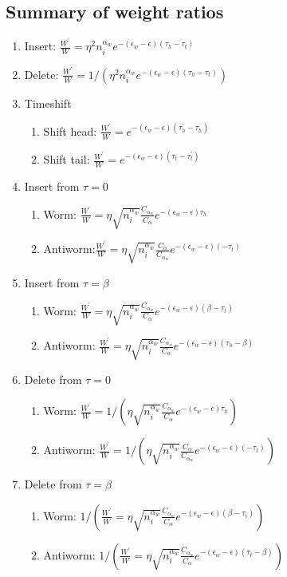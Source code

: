 \documentclass[12pt, two sided]{article}
\begin{document}
	\subsection{Summary of weight ratios}	
    \begin{enumerate}
        \setcounter{enumi}{0}
    \item Insert:  $\frac{W^\prime}{W}= \eta^2 n_i^{\alpha_w} e^{-(\epsilon_w-\epsilon)(\tau_h-\tau_t)}$
    \item Delete: $\frac{W^\prime}{W}= 1/(\eta^2 n_i^{\alpha_w} e^{-(\epsilon_w-\epsilon)(\tau_h-\tau_t)})$
    \item Timeshift
    	\begin{enumerate}
	\item{Shift head: $\frac{W^\prime}{W}=e^{-(\epsilon_w-\epsilon)(\tau_h^\prime-\tau_h)}$}
	\item{Shift tail: $\frac{W^\prime}{W}=e^{-(\epsilon_w-\epsilon)(\tau_t-\tau_t^\prime)}$}
	\end{enumerate}
    \item Insert from $\tau=0$
    	\begin{enumerate}
	\item{Worm: $\frac{W^\prime}{W}= \eta \sqrt{n_i^{\alpha_w}} \frac{C_{\alpha_w}}{C_{\alpha}}e^{-(\epsilon_w-\epsilon)\tau_h}$ }
	\item{Antiworm:$\frac{W^\prime}{W}= \eta \sqrt{n_i^{\alpha_w}} \frac{C_{\alpha}}{C_{\alpha_w}}e^{-(\epsilon_w-\epsilon)(-\tau_t)}$ }
	\end{enumerate}
    \item Insert from $\tau=\beta$
    	\begin{enumerate}
	\item{Worm: $\frac{W^\prime}{W}= \eta \sqrt{n_i^{\alpha_w}} \frac{C_{\alpha_w}}{C_{\alpha}}e^{-(\epsilon_w-\epsilon)(\beta-\tau_t)}$}
	\item{Antiworm: $\frac{W^\prime}{W}= \eta \sqrt{n_i^{\alpha_w}} \frac{C_{\alpha_w}}{C_{\alpha}}e^{-(\epsilon_w-\epsilon)(\tau_h - \beta)}$}
	\end{enumerate}
    \item Delete from $\tau=0$
    	\begin{enumerate}
	\item{Worm: $\frac{W^\prime}{W}= 1/(\eta \sqrt{n_i^{\alpha_w}} \frac{C_{\alpha_w}}{C_{\alpha}}e^{-(\epsilon_w-\epsilon)\tau_h})$}
	\item{Antiworm: $\frac{W^\prime}{W}= 1/(\eta \sqrt{n_i^{\alpha_w}} \frac{C_{\alpha}}{C_{\alpha_w}}e^{-(\epsilon_w-\epsilon)(-\tau_t)}) $}
	\end{enumerate}
    \item Delete from $\tau=\beta$
    	\begin{enumerate}
	\item{Worm: $1/(\frac{W^\prime}{W}= \eta \sqrt{n_i^{\alpha_w}} \frac{C_{\alpha_w}}{C_{\alpha}}e^{-(\epsilon_w-\epsilon)(\beta-\tau_t)})$}
	\item{Antiworm: $1/(\frac{W^\prime}{W}= \eta \sqrt{n_i^{\alpha_w}} \frac{C_{\alpha_w}}{C_{\alpha}}e^{-(\epsilon_w-\epsilon)(\tau_t - \beta)})$}
	\end{enumerate}
    \end{enumerate}
\end{document}
